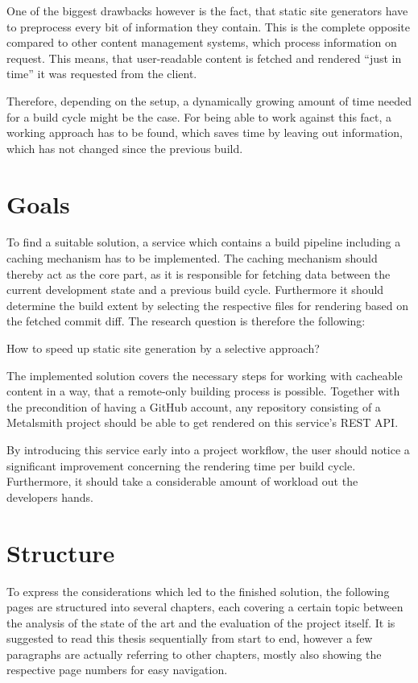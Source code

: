 One of the biggest drawbacks however is the fact, that static site generators have to preprocess every bit of information they contain. This is the complete opposite compared to other content management systems, which process information on request. This means, that user-readable content is fetched and rendered ``just in time'' it was requested from the client.

Therefore, depending on the setup, a dynamically growing amount of time needed for a build cycle might be the case. For being able to work against this fact, a working approach has to be found, which saves time by leaving out information, which has not changed since the previous build.

\section{Goals}
\label{sec:goals}
To find a suitable solution, a service which contains a build pipeline including a caching mechanism has to be implemented. The caching mechanism should thereby act as the core part, as it is responsible for fetching data between the current development state and a previous build cycle. Furthermore it should determine the build extent by selecting the respective files for rendering based on the fetched commit diff. The research question is therefore the following:

\begin{center}
  How to speed up static site generation by a selective approach?
\end{center}

The implemented solution covers the necessary steps for working with cacheable content in a way, that a remote-only building process is possible. Together with the precondition of having a GitHub account, any repository consisting of a Metalsmith project should be able to get rendered on this service's REST API.

By introducing this service early into a project workflow, the user should notice a significant improvement concerning the rendering time per build cycle. Furthermore, it should take a considerable amount of workload out the developers hands.

\section{Structure}
\label{sec:structure}
To express the considerations which led to the finished solution, the following pages are structured into several chapters, each covering a certain topic between the analysis of the state of the art and the evaluation of the project itself. It is suggested to read this thesis sequentially from start to end, however a few paragraphs are actually referring to other chapters, mostly also showing the respective page numbers for easy navigation.

